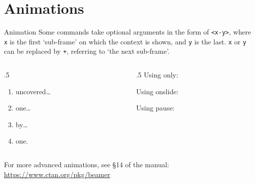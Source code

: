 \section{Animations}
\setlength{\splitpos}{0pt}
\rightfooterwhitefalse

\begin{frame}[fragile]{Animation}
  Some commands take optional arguments in the form of \verb|<x-y>|,
  where \verb|x| is the first `sub-frame' on which the context is shown,
  and \verb|y| is the last. \verb|x| or \verb|y| can be replaced by \verb|+|,
  referring to `the next sub-frame'. 
  \vfill
  \begin{columns}[T,onlytextwidth]
  \begin{column}{.5\textwidth}
    \begin{enumerate}
      \item<+-> uncovered\ldots
      \item<+-> one\ldots
      \item<+-> by\ldots
      \item<+-> one.
    \end{enumerate}
    \end{column}
  \begin{column}{.5\textwidth}
      Using only:

      Using onslide:

      Using pause:
  \end{column}
  \end{columns}
  \vfill
  For more advanced animations, see \S 14 of the manual:\\
  \url{https://www.ctan.org/pkg/beamer}
  \vfill
\end{frame}